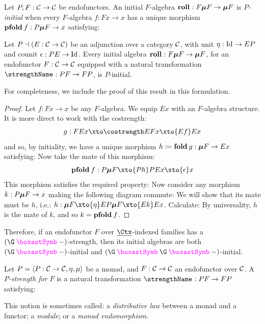 \begin{definition}
  Let $P, F : \mathcal{C}\/ \to \mathcal{C}\/$ be endofunctors. An
  initial $F$-algebra $\roll : F\fix F \to \fix F$ is
  \emph{$P$-initial} when every $F$-algebra $f : Fx \to x$ has a
  unique morphism $\pfold f : P\fix F \to x$ satisfying: 
\end{definition}

\begin{theorem}%
  Let $P \dashv (E : \mathcal{C}\/ \to \mathcal{C}\/)$ be an adjunction over
  a category $\mathcal{C}\/$, with unit $\eta : {\rm Id}_{{}} \to EP$ and counit
  $\epsilon : PE \to \Id$. Every initial algebra $\roll : F\fix F \to
  \fix F$, for an endofunctor $F : \mathcal{C}\/ \to \mathcal{C}\/$ equipped with a
  natural transformation $\strength : PF \to FP$, is $P$-initial.
\end{theorem}

For completeness, we include the proof of this result in this
formulation.

\begin{proof}
  Let $f : Fx \to x$ be any $F$-algebra.  We equip $Ex$ with an
  $F$-algebra structure. It is more direct to work with the costrength:
  \[
  g : FEx \xto\costrength EFx \xto{Ef} Ex
  \]
  and so, by initiality, we have a unique morphism $h \definedby \fold
  g : \fix F \to Ex$ satisfying:
  Now take the mate of this morphism:
  \[
  \pfold f :P\fix F \xto{Ph} PEx \xto{\epsilon} x
  \]
  This morphism satisfies the required property:
  Now consider any morphism $k : P\boldsymbol\mu F \to x$ making the following
  diagram commute:
  We will show that its mate must be $h$, i.e.: $h : \fix F \xto{\eta}
  EP\fix F \xto{Ek} Ex$. Calculate:
  By universality, $h$ is the mate of $k$, and so $k = \pfold f$.
\end{proof}

Therefore, if an endofunctor $F$ over $\carrier\Ctx$-indexed families
has a $(\gast-)$-strength, then its initial algebras are both
$(\gast-)$-initial and $(\gast\gast-)$-initial.

\begin{definition}
  Let $P = \left<{{P : \mathcal{C}\/ \to \mathcal{C}\/}, {\eta}, {\mu}}\right>$ be a monad, and $F :
  \mathcal{C}\/ \to \mathcal{C}\/$ an endofunctor over $\mathcal{C}\/$. A \emph{$P$-strength for $F$}
  is a natural transformation $\strength : PF \to FP$ satisfying:
  \begin{center}
    \qquad
  \end{center}
\end{definition}
This notion is sometimes called: a \emph{distributive law} between a
monad and a functor; a \emph{module}; or a \emph{monad endomorphism}.

